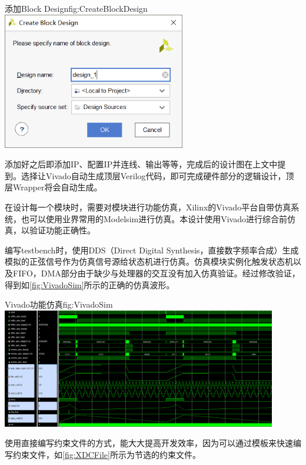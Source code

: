 \documentclass[supercite]{HustGraduPaper}
\begin{document}
	\begin{generalfig}[htb]{添加Block Design}{fig:CreateBlockDesign}
		\includegraphics[width=8cm]{Figures/CreateBlockDesign.png}
	\end{generalfig}
	
	
	
	添加好之后即添加IP、配置IP并连线、输出等等，完成后的设计图在上文中提到。选择让Vivado自动生成顶层Verilog代码，即可完成硬件部分的逻辑设计，顶层Wrapper将会自动生成。
	
	在设计每一个模块时，需要对模块进行功能仿真，Xilinx的Vivado平台自带仿真系统，也可以使用业界常用的Modelsim进行仿真。本设计使用Vivado进行综合前仿真，以验证功能正确性。
	
	编写testbench时，使用DDS（Direct Digital Synthesis，直接数字频率合成）生成模拟的正弦信号作为仿真信号源给状态机进行仿真。仿真模块实例化触发状态机以及FIFO，DMA部分由于缺少与处理器的交互没有加入仿真验证。经过修改验证，得到如\autoref{fig:VivadoSim}所示的正确的仿真波形。
	
	\begin{generalfig}[htb]{Vivado功能仿真}{fig:VivadoSim}
		\includegraphics[width=12cm]{Figures/VivadoSim.png}
	\end{generalfig}	
	

	使用直接编写约束文件的方式，能大大提高开发效率，因为可以通过模板来快速编写约束文件，如\autoref{fig:XDCFile}所示为节选的约束文件。
	
\end{document}
